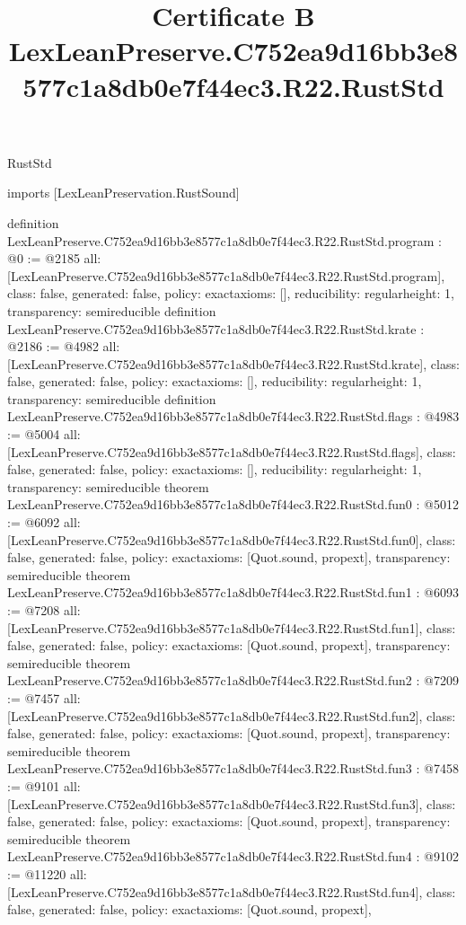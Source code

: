 \begin{lexlean}{RustStd}
\title{Certificate B LexLeanPreserve.C752ea9d16bb3e8577c1a8db0e7f44ec3.R22.RustStd}
\begin{coremodule}
imports [LexLeanPreservation.RustSound]

definition LexLeanPreserve.C752ea9d16bb3e8577c1a8db0e7f44ec3.R22.RustStd.program : @0 := @2185 {
  all: [LexLeanPreserve.C752ea9d16bb3e8577c1a8db0e7f44ec3.R22.RustStd.program],
  class: false,
  generated: false,
  policy: exact{axioms: []},
  reducibility: regular{height: 1},
  transparency: semireducible
}
definition LexLeanPreserve.C752ea9d16bb3e8577c1a8db0e7f44ec3.R22.RustStd.krate : @2186 := @4982 {
  all: [LexLeanPreserve.C752ea9d16bb3e8577c1a8db0e7f44ec3.R22.RustStd.krate],
  class: false,
  generated: false,
  policy: exact{axioms: []},
  reducibility: regular{height: 1},
  transparency: semireducible
}
definition LexLeanPreserve.C752ea9d16bb3e8577c1a8db0e7f44ec3.R22.RustStd.flags : @4983 := @5004 {
  all: [LexLeanPreserve.C752ea9d16bb3e8577c1a8db0e7f44ec3.R22.RustStd.flags],
  class: false,
  generated: false,
  policy: exact{axioms: []},
  reducibility: regular{height: 1},
  transparency: semireducible
}
theorem LexLeanPreserve.C752ea9d16bb3e8577c1a8db0e7f44ec3.R22.RustStd.fun0 : @5012 := @6092 {
  all: [LexLeanPreserve.C752ea9d16bb3e8577c1a8db0e7f44ec3.R22.RustStd.fun0],
  class: false,
  generated: false,
  policy: exact{axioms: [Quot.sound, propext]},
  transparency: semireducible
}
theorem LexLeanPreserve.C752ea9d16bb3e8577c1a8db0e7f44ec3.R22.RustStd.fun1 : @6093 := @7208 {
  all: [LexLeanPreserve.C752ea9d16bb3e8577c1a8db0e7f44ec3.R22.RustStd.fun1],
  class: false,
  generated: false,
  policy: exact{axioms: [Quot.sound, propext]},
  transparency: semireducible
}
theorem LexLeanPreserve.C752ea9d16bb3e8577c1a8db0e7f44ec3.R22.RustStd.fun2 : @7209 := @7457 {
  all: [LexLeanPreserve.C752ea9d16bb3e8577c1a8db0e7f44ec3.R22.RustStd.fun2],
  class: false,
  generated: false,
  policy: exact{axioms: [Quot.sound, propext]},
  transparency: semireducible
}
theorem LexLeanPreserve.C752ea9d16bb3e8577c1a8db0e7f44ec3.R22.RustStd.fun3 : @7458 := @9101 {
  all: [LexLeanPreserve.C752ea9d16bb3e8577c1a8db0e7f44ec3.R22.RustStd.fun3],
  class: false,
  generated: false,
  policy: exact{axioms: [Quot.sound, propext]},
  transparency: semireducible
}
theorem LexLeanPreserve.C752ea9d16bb3e8577c1a8db0e7f44ec3.R22.RustStd.fun4 : @9102 := @11220 {
  all: [LexLeanPreserve.C752ea9d16bb3e8577c1a8db0e7f44ec3.R22.RustStd.fun4],
  class: false,
  generated: false,
  policy: exact{axioms: [Quot.sound, propext]},
}
\end{coremodule}
\end{lexlean}
